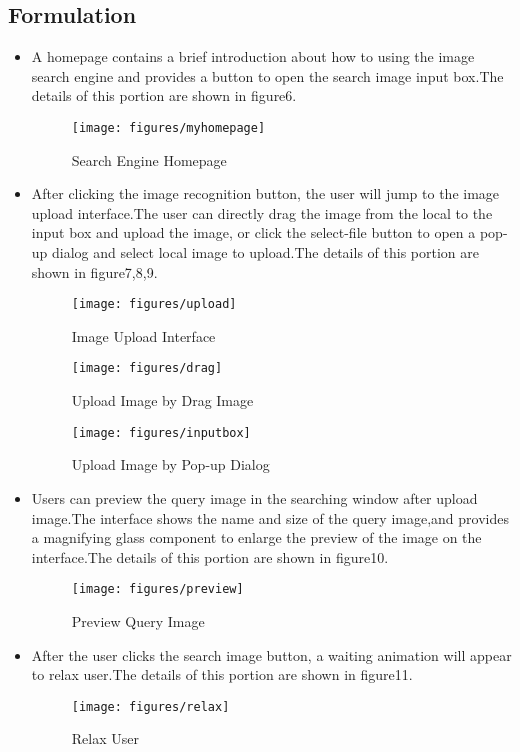 \documentclass{hci}
\begin{document}
\subsection{Formulation}
\begin{itemize}
	\item A homepage contains a brief introduction about how to using the image search engine and provides a button to open the search image input box.The details of this portion are shown in figure6.
	\begin{figure}[htbp]
		\centering
		\texttt{[image: figures/myhomepage]}
		\caption{Search Engine Homepage}
		\label{fig:myhomepage}
	\end{figure}
	\item After clicking the image recognition button, the user will jump to the image upload interface.The user can directly drag the image from the local to the input box and upload the image, or click the select-file button to open a pop-up dialog and select local image to upload.The details of this portion are shown in figure7,8,9.
	\begin{figure}[htbp]
		\centering
		\texttt{[image: figures/upload]}
		\caption{Image Upload Interface}
		\label{fig:upload}
	\end{figure}
	\begin{figure}[htbp]
	\centering
	\texttt{[image: figures/drag]}
	\caption{Upload Image by Drag Image}
	\label{fig:drag}
	\end{figure}
	\begin{figure}[htbp]
		\centering
		\texttt{[image: figures/inputbox]}
		\caption{Upload Image by Pop-up Dialog}
		\label{fig:inputbox}
	\end{figure}
	\item Users can preview the query image in the searching window after upload image.The interface shows the name and size of the query image,and provides a magnifying glass component to enlarge the preview of the image on the interface.The details of this portion are shown in figure10.
	\begin{figure}[htbp]
		\centering
		\texttt{[image: figures/preview]}
		\caption{Preview Query Image}
		\label{fig:preview}
	\end{figure}
	\item After the user clicks the search image button, a waiting animation will appear to relax user.The details of this portion are shown in figure11.
	\begin{figure}[htbp]
		\centering
		\texttt{[image: figures/relax]}
		\caption{Relax User}
		\label{fig:relax}
	\end{figure}
	
\end{itemize}
\end{document}
